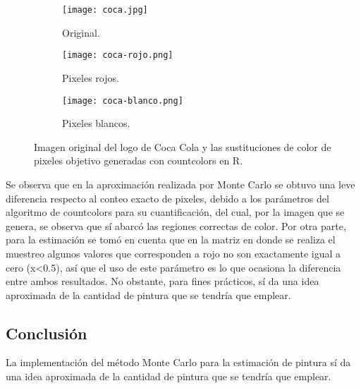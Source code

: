 \documentclass{article}
\begin{document}
\begin{figure}
\centering
\begin{subfigure}[b]{0.3\linewidth}
\texttt{[image: coca.jpg]}
\caption{Original.}
\label{o}
\end{subfigure}
\begin{subfigure}[b]{0.3\linewidth}
\texttt{[image: coca-rojo.png]}
\caption{Pixeles rojos.}
\label{s}
\end{subfigure}
\begin{subfigure}[b]{0.3\linewidth}
\texttt{[image: coca-blanco.png]}
\caption{Pixeles blancos.}
\label{se}
\end{subfigure}
\caption{Imagen original del logo de Coca Cola y las sustituciones de color de pixeles objetivo generadas con countcolors en R.}
\label{celdas}
\end{figure}

Se observa que en la aproximación realizada por Monte Carlo se obtuvo una leve diferencia respecto al conteo exacto de pixeles, debido a los parámetros del algoritmo de countcolors para su cuantificación, del cual, por la imagen que se genera, se observa que sí abarcó las regiones correctas de color. Por otra parte, para la estimación se tomó en cuenta que en la matriz en donde se realiza el muestreo algunos valores que corresponden a rojo no son exactamente igual a cero (x<0.5), así que el uso de este parámetro es lo que ocasiona la diferencia entre ambos resultados. No obstante, para fines prácticos, sí da una idea aproximada de la cantidad de pintura que se tendría que emplear.

\subsection{Conclusión}
La implementación del método Monte Carlo para la estimación de pintura sí da una idea aproximada de la cantidad de pintura que se tendría que emplear.




\end{document}
